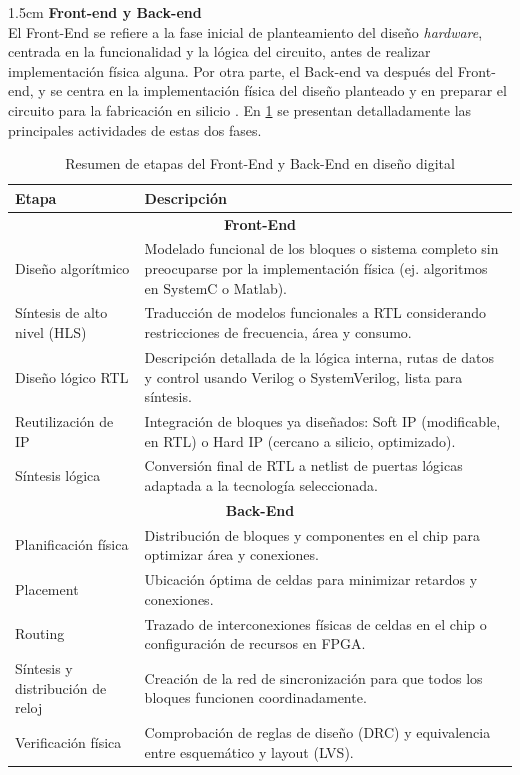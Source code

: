 \vspace{0.4em} %

\begin{adjustwidth}{1.5cm}{}
\textbf{Front-end y Back-end} \vspace{0.25cm} \\
El Front-End se refiere a la fase inicial de planteamiento del diseño \textit{hardware}, centrada en la funcionalidad y la lógica del circuito, antes de realizar implementación física alguna. Por otra parte, el Back-end va después del Front-end, y se centra en la implementación física del diseño planteado y en preparar el circuito para la fabricación en silicio \cite{metodologiaFernando}. En \ref{tbl:frontBack} se presentan detalladamente las principales actividades de estas dos fases.

\begin{table}[h!]
\centering
\begin{tabular}{|l|p{9cm}|}
\hline
\textbf{Etapa} & \textbf{Descripción} \\ \hline
\multicolumn{2}{|c|}{\textbf{Front-End}} \\ \hline
Diseño algorítmico & Modelado funcional de los bloques o sistema completo sin preocuparse por la implementación física (ej. algoritmos en SystemC o Matlab). \\ \hline
Síntesis de alto nivel (HLS) & Traducción de modelos funcionales a RTL considerando restricciones de frecuencia, área y consumo. \\ \hline
Diseño lógico RTL & Descripción detallada de la lógica interna, rutas de datos y control usando Verilog o SystemVerilog, lista para síntesis. \\ \hline
Reutilización de IP & Integración de bloques ya diseñados: Soft IP (modificable, en RTL) o Hard IP (cercano a silicio, optimizado). \\ \hline
Síntesis lógica & Conversión final de RTL a netlist de puertas lógicas adaptada a la tecnología seleccionada. \\ \hline
\multicolumn{2}{|c|}{\textbf{Back-End}} \\ \hline
Planificación física & Distribución de bloques y componentes en el chip para optimizar área y conexiones. \\ \hline
Placement & Ubicación óptima de celdas para minimizar retardos y conexiones. \\ \hline
Routing & Trazado de interconexiones físicas de celdas en el chip o configuración de recursos en FPGA. \\ \hline
Síntesis y distribución de reloj & Creación de la red de sincronización para que todos los bloques funcionen coordinadamente. \\ \hline
Verificación física & Comprobación de reglas de diseño (DRC) y equivalencia entre esquemático y layout (LVS). \\ \hline
\end{tabular}
\caption{Resumen de etapas del Front-End y Back-End en diseño digital}
\label{tbl:frontBack}
\end{table}
\end{adjustwidth}


